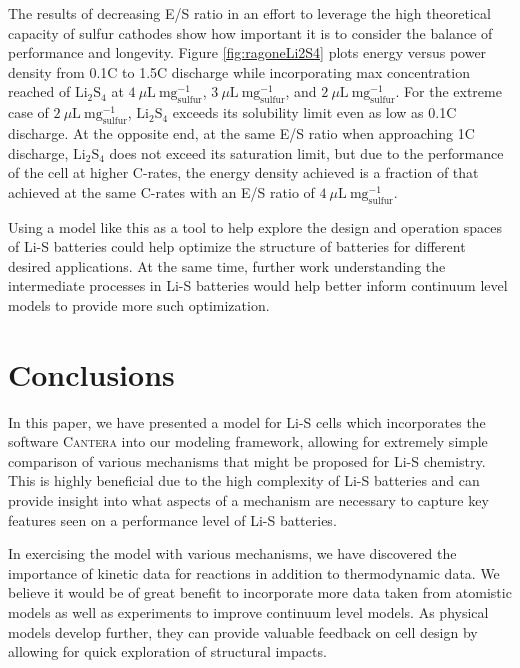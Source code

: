 \documentclass{elsarticle}
\begin{document}
The results of decreasing E/S ratio in an effort to leverage the high theoretical capacity of sulfur cathodes show how important it is to consider the balance of performance and longevity. Figure \ref{fig:ragoneLi2S4} plots energy versus power density from 0.1C to 1.5C discharge while incorporating max concentration reached of $\mathrm{Li}_2\mathrm{S}_4$ at $4 ~ \mu\mathrm{L} ~ \mathrm{mg}^{-1}_\mathrm{sulfur}$, $3 ~ \mu\mathrm{L} ~ \mathrm{mg}^{-1}_\mathrm{sulfur}$, and $2 ~ \mu\mathrm{L} ~ \mathrm{mg}^{-1}_\mathrm{sulfur}$. For the extreme case of $2 ~ \mu\mathrm{L} ~ \mathrm{mg}^{-1}_\mathrm{sulfur}$, $\mathrm{Li}_2\mathrm{S}_4$ exceeds its solubility limit even as low as 0.1C discharge. At the opposite end, at the same E/S ratio when approaching 1C discharge, $\mathrm{Li}_2\mathrm{S}_4$ does not exceed its saturation limit, but due to the performance of the cell at higher C-rates, the energy density achieved is a fraction of that achieved at the same C-rates with an E/S ratio of $4 ~ \mu\mathrm{L} ~ \mathrm{mg}^{-1}_\mathrm{sulfur}$. 

Using a model like this as a tool to help explore the design and operation spaces of Li-S batteries could help optimize the structure of batteries for different desired applications. At the same time, further work understanding the intermediate processes in Li-S batteries would help better inform continuum level models to provide more such optimization. 

\section{Conclusions}

In this paper, we have presented a model for Li-S cells which incorporates the software \textsc{Cantera} into our modeling framework, allowing for extremely simple comparison of various mechanisms that might be proposed for Li-S chemistry. This is highly beneficial due to the high complexity of Li-S batteries and can provide insight into what aspects of a mechanism are necessary to capture key features seen on a performance level of Li-S batteries. 

In exercising the model with various mechanisms, we have discovered the importance of kinetic data for reactions in addition to thermodynamic data. We believe it would be of great benefit to incorporate more data taken from atomistic models as well as experiments to improve continuum level models. As physical models develop further, they can provide valuable feedback on cell design by allowing for quick exploration of structural impacts.


\newpage

\newpage
\end{document}
